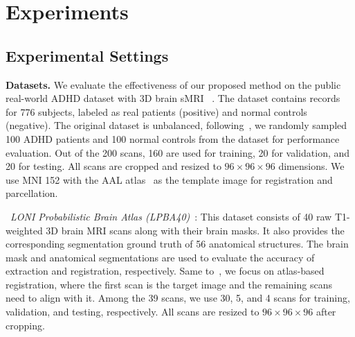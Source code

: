 

%
\vspace{-5pt}
\section{Experiments}
\label{section:Experiments}

\subsection{Experimental Settings}

\noindent\textbf{Datasets.} We evaluate the effectiveness of our proposed method on the public real-world ADHD dataset with 3D brain sMRI~
\cite{adhd2012adhd}. The dataset contains records for 776 subjects, labeled as real patients (positive) and normal controls (negative). %
The original dataset is unbalanced, following~\cite{kong2013discriminative}, we randomly sampled 100 ADHD patients and 100 normal controls from the dataset for performance evaluation.
Out of the 200 scans, 160 are used for training, 20 for validation, and 20 for testing. All scans are cropped and resized to $96\times96\times96$ dimensions.
We use MNI 152 with the AAL atlas~\cite{tzourio2002automated} as the template image for registration and parcellation. 

\iffalse
\noindent\textbullet\ \textit{LONI Probabilistic Brain Atlas (LPBA40)}~\cite{shattuck2008construction}: 
This dataset consists of 40 raw T1-weighted 3D brain MRI scans along with their brain masks. It also provides the corresponding segmentation ground truth of 56 anatomical structures. The brain mask and anatomical segmentations are used to evaluate the accuracy of extraction and registration, respectively. Same to~\cite{balakrishnan2018unsupervised, zhao2019recursive}, we focus on atlas-based registration, where the first scan is the target image and the remaining scans need to align with it. Among the 39 scans, we use 30, 5, and 4 scans for training, validation, and testing, respectively. All scans are resized to $96\times96\times96$ after cropping.


